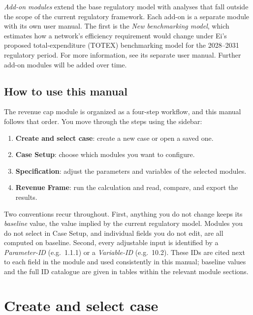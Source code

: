 \emph{Add-on modules} extend the base regulatory model with analyses that fall outside the scope of the current regulatory framework. Each add-on is a separate module with its own user manual. The first is the \emph{New benchmarking model}, which estimates how a network's efficiency requirement would change under Ei's proposed total-expenditure (TOTEX) benchmarking model for the 2028--2031 regulatory period. For more information, see its separate user manual. Further add-on modules will be added over time.

\subsection*{How to use this manual}
The revenue cap module is organized as a four-step workflow, and this manual follows that order. You move through the steps using the sidebar:

\begin{enumerate}
  \item \textbf{Create and select case}: create a new case or open a saved one.
  \item \textbf{Case Setup}: choose which modules you want to configure.
  \item \textbf{Specification}: adjust the parameters and variables of the selected modules.
  \item \textbf{Revenue Frame}: run the calculation and read, compare, and export the results.
\end{enumerate}

Two conventions recur throughout. First, anything you do not change keeps its \emph{baseline} value, the value implied by the current regulatory model. Modules you do not select in Case Setup, and individual fields you do not edit, are all computed on baseline. Second, every adjustable input is identified by a \emph{Parameter-ID} (e.g.\ 1.1.1) or a \emph{Variable-ID} (e.g.\ 10.2). These IDs are cited next to each field in the module and used consistently in this manual; baseline values and the full ID catalogue are given in tables within the relevant module sections.


\section{Create and select case}
\label{sec:page-case}

